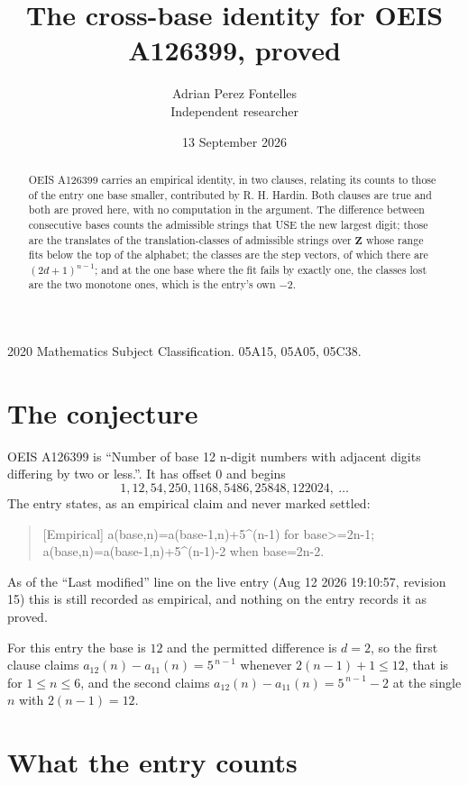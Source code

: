 \documentclass[11pt,a4paper]{article}
\title{The cross-base identity for OEIS A126399, proved}
\author{Adrian Perez Fontelles\\ \small Independent researcher}
\date{13 September 2026}
\theoremstyle{plain}
\theoremstyle{definition}
\begin{document}
\maketitle

\begin{abstract}
OEIS A126399 carries an empirical identity, in two clauses, relating its counts to those of the
entry one base smaller, contributed by R. H. Hardin. Both clauses are true and both are proved
here, with no computation in the argument. The difference between consecutive bases counts the
admissible strings that USE the new largest digit; those are the translates of the
translation-classes of admissible strings over $\mathbf{Z}$ whose range fits below the top of
the alphabet; the classes are the step vectors, of which there are $(2d+1)^{n-1}$; and at the
one base where the fit fails by exactly one, the classes lost are the two monotone ones, which
is the entry's own $-2$.
\end{abstract}

\noindent\small 2020 Mathematics Subject Classification. 05A15, 05A05, 05C38.\normalsize

\section{The conjecture}

OEIS A126399 is ``Number of base 12 n-digit numbers with adjacent digits differing by two or less.''. It has offset $0$ and begins
\[
1, 12, 54, 250, 1168, 5486, 25848, 122024,\ \dots
\]
The entry states, as an empirical claim and never marked settled:
\begin{quote}
[Empirical] a(base,n)=a(base-1,n)+5\textasciicircum{}(n-1) for base>=2n-1; a(base,n)=a(base-1,n)+5\textasciicircum{}(n-1)-2 when base=2n-2.
\end{quote}
As of the ``Last modified'' line on the live entry (Aug 12 2026 19:10:57, revision 15)
this is still recorded as empirical, and nothing on the entry records it as proved.

For this entry the base is $12$ and the permitted difference is $d=2$, so the first clause
claims $a_{12}(n)-a_{11}(n)=5^{\,n-1}$ whenever $2(n-1)+1\le12$, that is for
$1\le n\le6$, and the second claims $a_{12}(n)-a_{11}(n)=5^{\,n-1}-2$ at the single
$n$ with $2(n-1)=12$.

\section{What the entry counts}
\end{document}
